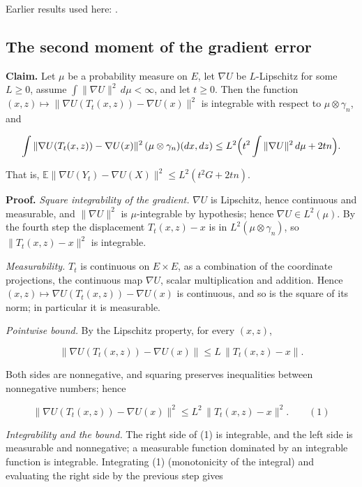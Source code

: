 \documentclass[11pt,a4paper]{report}
\begin{document}
Earlier results used here: \cite[Section~3.34.1]{LangevinLean2026ULASC}.
\subsection{\texorpdfstring{The second moment of the gradient error}{The second moment of the gradient error}}
\label{report-step-UnadjustedLangevin-LSI-GaussianDrift-lean-6}


\textbf{Claim.} Let \(\mu\) be a probability measure on \(E\), let \(\nabla U\) be \(L\)-Lipschitz for some \(L\ge0\), assume \(\int\|\nabla U\|^2\,d\mu<\infty\), and let \(t\ge0\). Then the function \((x,z)\mapsto\|\nabla U(T_t(x,z))-\nabla U(x)\|^2\) is integrable with respect to \(\mu\otimes\gamma_n\), and


\[\int\|\nabla U(T_t(x,z))-\nabla U(x)\|^2\,(\mu\otimes\gamma_n)(dx,dz)\le L^2\Bigl(t^2\int\|\nabla U\|^2\,d\mu+2tn\Bigr).\]


That is, \(\mathbb E\|\nabla U(Y_t)-\nabla U(X)\|^2\le L^2(t^2G+2tn)\).




\textbf{Proof.} \emph{Square integrability of the gradient.} \(\nabla U\) is Lipschitz, hence continuous and measurable, and \(\|\nabla U\|^2\) is \(\mu\)-integrable by hypothesis; hence \(\nabla U\in L^2(\mu)\). By the fourth step the displacement \(T_t(x,z)-x\) is in \(L^2(\mu\otimes\gamma_n)\), so \(\|T_t(x,z)-x\|^2\) is integrable.




\emph{Measurability.} \(T_t\) is continuous on \(E\times E\), as a combination of the coordinate projections, the continuous map \(\nabla U\), scalar multiplication and addition. Hence \((x,z)\mapsto\nabla U(T_t(x,z))-\nabla U(x)\) is continuous, and so is the square of its norm; in particular it is measurable.




\emph{Pointwise bound.} By the Lipschitz property, for every \((x,z)\),


\[\|\nabla U(T_t(x,z))-\nabla U(x)\|\le L\,\|T_t(x,z)-x\|.\]


Both sides are nonnegative, and squaring preserves inequalities between nonnegative numbers; hence


\[\|\nabla U(T_t(x,z))-\nabla U(x)\|^2\le L^2\,\|T_t(x,z)-x\|^2.\qquad(1)\]


\emph{Integrability and the bound.} The right side of (1) is integrable, and the left side is measurable and nonnegative; a measurable function dominated by an integrable function is integrable. Integrating (1) (monotonicity of the integral) and evaluating the right side by the previous step gives
\end{document}
